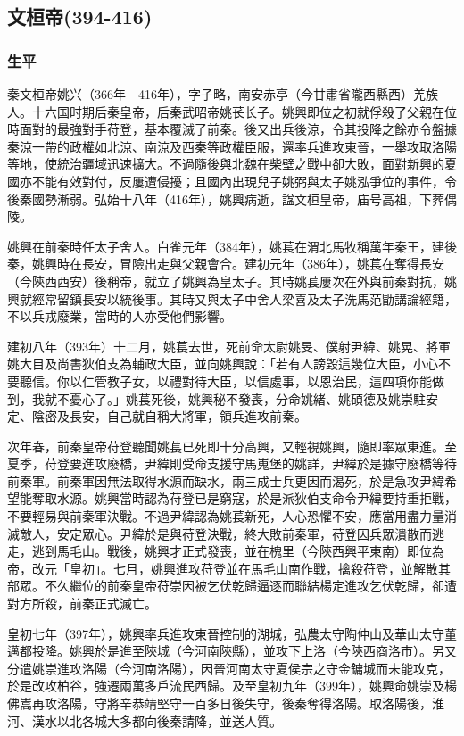 
\subsection{文桓帝\tiny(394-416)}

\subsubsection{生平}

秦文桓帝姚兴（366年－416年），字子略，南安赤亭（今甘肅省隴西縣西）羌族人。十六国时期后秦皇帝，后秦武昭帝姚苌长子。姚興即位之初就俘殺了父親在位時面對的最強對手苻登，基本覆滅了前秦。後又出兵後涼，令其投降之餘亦令盤據秦涼一帶的政權如北涼、南涼及西秦等政權臣服，還率兵進攻東晉，一舉攻取洛陽等地，使統治疆域迅速擴大。不過隨後與北魏在柴壁之戰中卻大敗，面對新興的夏國亦不能有效對付，反屢遭侵擾；且國內出現兒子姚弼與太子姚泓爭位的事件，令後秦國勢漸弱。弘始十八年（416年），姚興病逝，諡文桓皇帝，庙号高祖，下葬偶陵。

姚興在前秦時任太子舍人。白雀元年（384年），姚萇在渭北馬牧稱萬年秦王，建後秦，姚興時在長安，冒險出走與父親會合。建初元年（386年），姚萇在奪得長安（今陝西西安）後稱帝，就立了姚興為皇太子。其時姚萇屢次在外與前秦對抗，姚興就經常留鎮長安以統後事。其時又與太子中舍人梁喜及太子洗馬范勖講論經籍，不以兵戎廢業，當時的人亦受他們影響。

建初八年（393年）十二月，姚萇去世，死前命太尉姚旻、僕射尹緯、姚晃、將軍姚大目及尚書狄伯支為輔政大臣，並向姚興說：「若有人謗毀這幾位大臣，小心不要聽信。你以仁管教子女，以禮對待大臣，以信處事，以恩治民，這四項你能做到，我就不憂心了。」姚萇死後，姚興秘不發喪，分命姚緒、姚碩德及姚崇駐安定、陰密及長安，自己就自稱大將軍，領兵進攻前秦。

次年春，前秦皇帝苻登聽聞姚萇已死即十分高興，又輕視姚興，隨即率眾東進。至夏季，苻登要進攻廢橋，尹緯則受命支援守馬嵬堡的姚詳，尹緯於是據守廢橋等待前秦軍。前秦軍因無法取得水源而缺水，兩三成士兵更因而渴死，於是急攻尹緯希望能奪取水源。姚興當時認為苻登已是窮寇，於是派狄伯支命令尹緯要持重拒戰，不要輕易與前秦軍決戰。不過尹緯認為姚萇新死，人心恐懼不安，應當用盡力量消滅敵人，安定眾心。尹緯於是與苻登決戰，終大敗前秦軍，苻登因兵眾潰散而逃走，逃到馬毛山。戰後，姚興才正式發喪，並在槐里（今陝西興平東南）即位為帝，改元「皇初」。七月，姚興進攻苻登並在馬毛山南作戰，擒殺苻登，並解散其部眾。不久繼位的前秦皇帝苻崇因被乞伏乾歸逼逐而聯結楊定進攻乞伏乾歸，卻遭對方所殺，前秦正式滅亡。

皇初七年（397年），姚興率兵進攻東晉控制的湖城，弘農太守陶仲山及華山太守董邁都投降。姚興於是進至陝城（今河南陝縣），並攻下上洛（今陝西商洛市）。另又分遣姚崇進攻洛陽（今河南洛陽），因晉河南太守夏侯宗之守金鏞城而未能攻克，於是改攻柏谷，強遷兩萬多戶流民西歸。及至皇初九年（399年），姚興命姚崇及楊佛嵩再攻洛陽，守將辛恭靖堅守一百多日後失守，後秦奪得洛陽。取洛陽後，淮河、漢水以北各城大多都向後秦請降，並送人質。

